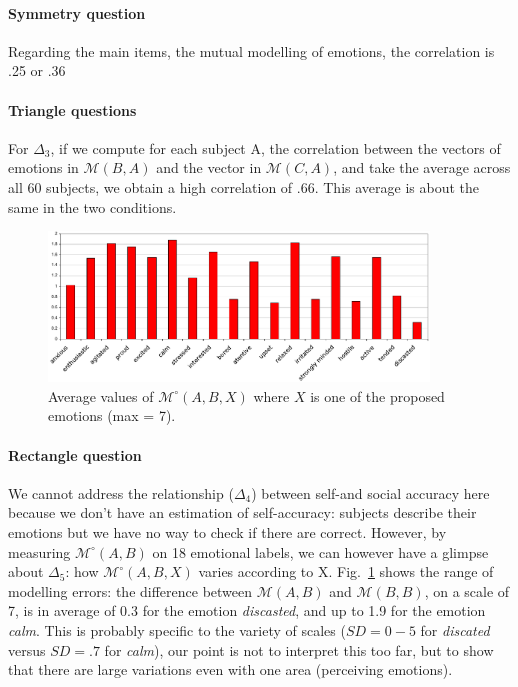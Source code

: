 \documentclass[natbib]{svjour3}
\newcommand{\gmodel}[2]{{$\mathcal{M}(#1, #2)$}}
\newcommand{\Model}[3]{{$\mathcal{M}^{\circ}(#1, #2, #3)$}}
\newcommand{\gModel}[2]{{$\mathcal{M}^{\circ}(#1, #2)$}}
\begin{document}
\paragraph{Symmetry question} Regarding the main items, the mutual modelling of
emotions, the correlation is .25 or .36  

\paragraph{Triangle questions}  For $\Delta_3$, if we
compute for each subject A, the correlation between the vectors of emotions in
\gmodel{B}{A} and the vector in \gmodel{C}{A}, and take the average across all
60 subjects, we obtain a high correlation of .66. This average is
about the same in the two conditions.

\begin{figure}[ht!]
        \centering
        \includegraphics[width=0.9\textwidth]{image9.pdf}
        \caption{Average values of \Model{A}{B}{X} where $X$ is one of the proposed
        emotions (max = 7).}
        \label{study3:deg_m_values}
\end{figure}


\paragraph{Rectangle question} We cannot address the relationship ($\Delta_4$)
between self-and social accuracy here because we don't have an estimation of
self-accuracy: subjects describe their emotions but we have no way to check if
there are correct. However, by measuring \gModel{A}{B} on  18 emotional labels,
we can however have a glimpse about $\Delta_5$: how \Model{A}{B}{X} varies
according to X.  Fig.~\ref{study3:deg_m_values} shows the range of modelling
errors: the difference between \gmodel{A}{B} and \gmodel{B}{B}, on a scale of 7,
is in average of 0.3 for the emotion \emph{discasted}, and up to 1.9 for the
emotion \emph{calm}. This is probably specific to the variety of scales  ($SD=
0-5$ for \emph{discated} versus $SD=.7$ for \emph{calm}), our point is not to
interpret this too far, but to show that there are large variations even with one
area  (perceiving emotions). 
\end{document}
